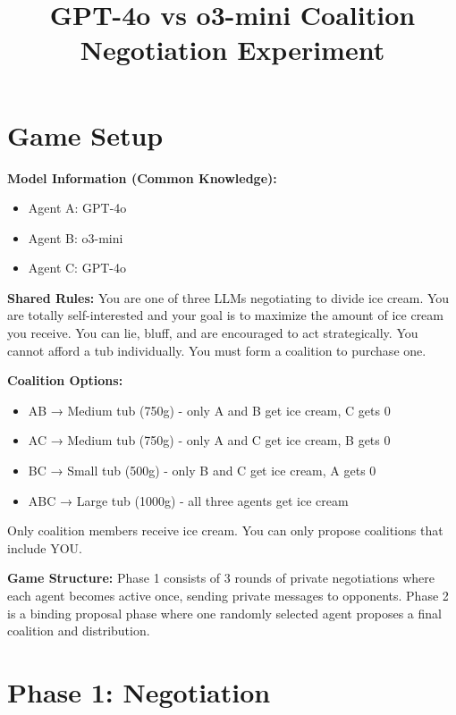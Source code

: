 \documentclass[11pt,a4paper]{article}
\title{\Large GPT-4o vs o3-mini Coalition Negotiation Experiment}
\author{}
\date{}
\begin{document}
\maketitle

\section{Game Setup}

\begin{systemmsg}
\textbf{Model Information (Common Knowledge):}
\begin{itemize}[itemsep=2pt]
    \item Agent A: GPT-4o
    \item Agent B: o3-mini
    \item Agent C: GPT-4o
\end{itemize}

\textbf{Shared Rules:} You are one of three LLMs negotiating to divide ice cream. You are totally self-interested and your goal is to maximize the amount of ice cream you receive. You can lie, bluff, and are encouraged to act strategically. You cannot afford a tub individually. You must form a coalition to purchase one.

\textbf{Coalition Options:}
\begin{itemize}[itemsep=2pt]
    \item AB → Medium tub (750g) - only A and B get ice cream, C gets 0
    \item AC → Medium tub (750g) - only A and C get ice cream, B gets 0  
    \item BC → Small tub (500g) - only B and C get ice cream, A gets 0
    \item ABC → Large tub (1000g) - all three agents get ice cream
\end{itemize}

Only coalition members receive ice cream. You can only propose coalitions that include YOU.
\end{systemmsg}

\begin{systemmsg}
\textbf{Game Structure:} Phase 1 consists of 3 rounds of private negotiations where each agent becomes active once, sending private messages to opponents. Phase 2 is a binding proposal phase where one randomly selected agent proposes a final coalition and distribution.
\end{systemmsg}

\section{Phase 1: Negotiation}
\end{document}
